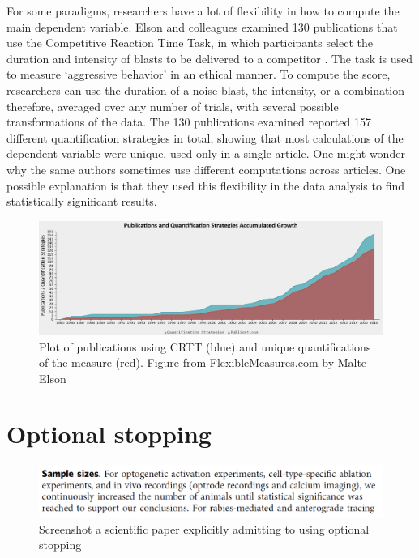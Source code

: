 \documentclass[
  oneside]{book}
\begin{document}
For some paradigms, researchers have a lot of flexibility in how to compute the main dependent variable. Elson and colleagues examined 130 publications that use the Competitive Reaction Time Task, in which participants select the duration and intensity of blasts to be delivered to a competitor \citep{elson_press_2014}. The task is used to measure `aggressive behavior' in an ethical manner. To compute the score, researchers can use the duration of a noise blast, the intensity, or a combination therefore, averaged over any number of trials, with several possible transformations of the data. The 130 publications examined reported 157 different quantification strategies in total, showing that most calculations of the dependent variable were unique, used only in a single article. One might wonder why the same authors sometimes use different computations across articles. One possible explanation is that they used this flexibility in the data analysis to find statistically significant results.



\begin{figure}

{\centering \includegraphics[width=1\linewidth]{images/flexiblemeasure} 

}

\caption{Plot of publications using CRTT (blue) and unique quantifications of the measure (red). Figure from FlexibleMeasures.com by Malte Elson}\label{fig:flexiblemeasure}
\end{figure}

\hypertarget{optionalstopping}{%
\section{Optional stopping}\label{optionalstopping}}



\begin{figure}

{\centering \includegraphics[width=1\linewidth]{images/optionalstoppingexample} 

}

\caption{Screenshot a scientific paper explicitly admitting to using optional stopping}\label{fig:optionalstoppingexample}
\end{figure}
\end{document}
